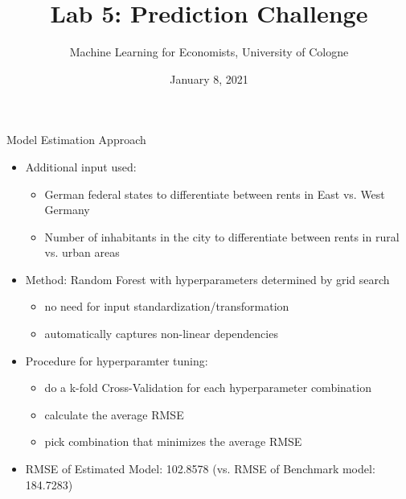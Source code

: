 \documentclass[11pt]{beamer}\usepackage[]{graphicx}\usepackage[]{color}
\title{Lab 5: Prediction Challenge}
\subtitle{Machine Learning for Economists, University of Cologne}
\date{January 8, 2021}
\begin{document}
\begin{frame}
\vspace{0.18cm}
\maketitle
\begin{center}
\end{center}
\vspace{0.1cm}
\end{frame}


\begin{frame}{Model Estimation Approach}
\begin{itemize}
\item Additional input used: 
\begin{itemize}
\item German federal states to differentiate between rents in East vs. West Germany 
\item Number of inhabitants in the city to differentiate between rents in rural vs. urban areas
\end{itemize}
\item Method: Random Forest with hyperparameters determined by grid search
\begin{itemize}
\item no need for input standardization/transformation 
\item automatically captures non-linear dependencies
\end{itemize}
\item Procedure for hyperparamter tuning:
\begin{itemize}
\item do a k-fold Cross-Validation for each hyperparameter combination
\item calculate the average RMSE
\item pick combination that minimizes the average RMSE
\end{itemize}
\item RMSE of Estimated Model: 102.8578 (vs. RMSE of Benchmark model: 184.7283)
\end{itemize}
\end{frame}
\end{document}
